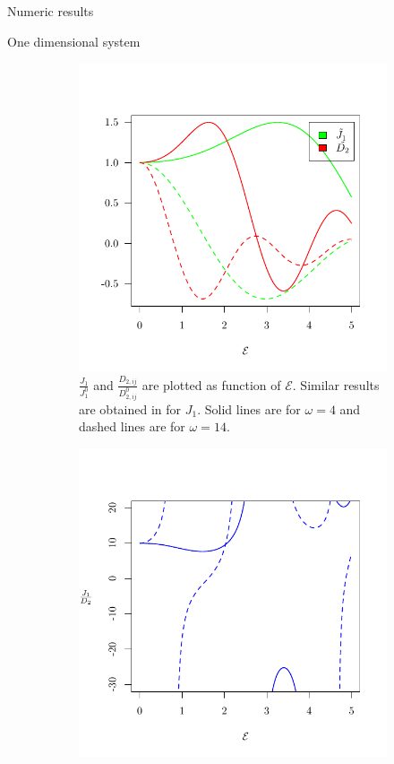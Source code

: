 \begin{section}{Numeric results}
\begin{subsection}{One dimensional system}
\begin{figure}
\centering
\begin{subfigure}{.45\textwidth}
  \includegraphics[width=1\linewidth]{Figures/NNvsNNN.pdf}
  \caption{$\frac{J_{1}}{J_{1}^0}$ and $\frac{D_{2,ij}}{D_{2,ij}^0}$ are plotted as function of $\mathcal{E}$. Similar results are obtained in \cite{Mentink2015} for $J_{1}$. Solid lines are for $\omega = 4$ and dashed lines are for $\omega = 14$.}
  \label{Fig3.1:NNvsNNN}
\end{subfigure}%
\hspace*{\fill}
\begin{subfigure}{.45\textwidth}
  \includegraphics[width=1\linewidth]{Figures/ratio.pdf}

\end{subfigure}
\end{figure}
\end{subsection}
\end{section}
